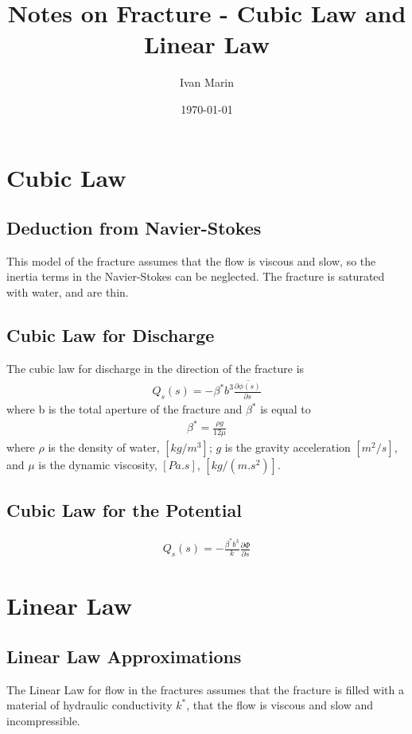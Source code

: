 \documentclass[11pt]{article}
\title{Notes on Fracture - Cubic Law and Linear Law}
\author{Ivan Marin}
\date{\today}
\begin{document}
\maketitle


\section{Cubic Law}
\subsection{Deduction from Navier-Stokes}
This model of the fracture assumes that the flow is viscous and slow, so the inertia terms in the Navier-Stokes can be neglected. The fracture is saturated with water, and are thin.
\subsection{Cubic Law for Discharge}
The cubic law for discharge in the direction of the fracture is 
\begin{align}
Q_{s}(s) = -\beta^{*}b^{3}\frac{\partial \tilde{\phi(s)}}{\partial s}
\end{align}
where b is the total aperture of the fracture and $\beta^{*}$ is equal to
\begin{align}
\beta^{*} = \frac{\rho g}{12\mu}
\end{align}
where $\rho$ is the density of water, $[kg/m^{3}]$; $g$ is the gravity acceleration $[m^{2}/s]$, and $\mu$ is the dynamic viscosity, $[Pa.s]$, $[kg/(m.s^{2})]$. 

\subsection{Cubic Law for the Potential}
\begin{align}
Q_{s}(s) = - \frac{\beta^{*}b^{3}}{k}\frac{\partial \Phi}{\partial s}
\end{align}

\section{Linear Law}
\subsection{Linear Law Approximations}
The Linear Law for flow in the fractures assumes that the fracture is filled with a material of hydraulic conductivity $k^{*}$, that the flow is viscous and slow and incompressible.
\end{document}
